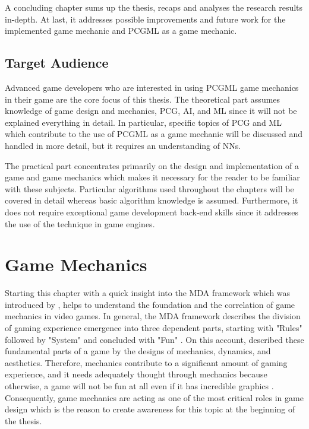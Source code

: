 \documentclass[MGS,Master,english]{twbook}%
\begin{document}
A concluding chapter sums up the thesis, recaps and analyses the research results in-depth. At last, it addresses possible improvements and future work for the implemented game mechanic and \ac{PCGML} as a game mechanic.

\section{Target Audience}
Advanced game developers who are interested in using \ac{PCGML} game mechanics in their game are the core focus of this thesis. The theoretical part assumes knowledge of game design and mechanics, \ac{PCG}, \ac{AI}, and \ac{ML} since it will not be explained everything in detail. In particular, specific topics of \ac{PCG} and \ac{ML} which contribute to the use of \ac{PCGML} as a game mechanic will be discussed and handled in more detail, but it requires an understanding of \acp{NN}.

The practical part concentrates primarily on the design and implementation of a game and game mechanics which makes it necessary for the reader to be familiar with these subjects. Particular algorithms used throughout the chapters will be covered in detail whereas basic algorithm knowledge is assumed. Furthermore, it does not require exceptional game development back-end skills since it addresses the use of the technique in game engines.

%
%
\clearpage
\chapter{Game Mechanics} \label{gameMechanicsChapter}
Starting this chapter with a quick insight into the \ac{MDA} framework which was introduced by \citep{mechanic::MDA}, helps to understand the foundation and the correlation of game mechanics in video games. In general, the \ac{MDA} framework describes the division of gaming experience emergence into three dependent parts, starting with "Rules" followed by "System" and concluded with "Fun" \cite{mechanic::MDA}.  On this account, \citep{mechanic::MDA} described these fundamental parts of a game by the designs of mechanics, dynamics, and aesthetics. Therefore, mechanics contribute to a significant amount of gaming experience, and it needs adequately thought through mechanics because otherwise, a game will not be fun at all even if it has incredible graphics \cite{gameDesign::gameMechanicsAdvancedGameDesign}. Consequently, game mechanics are acting as one of the most critical roles in game design which is the reason to create awareness for this topic at the beginning of the thesis.
\end{document}
